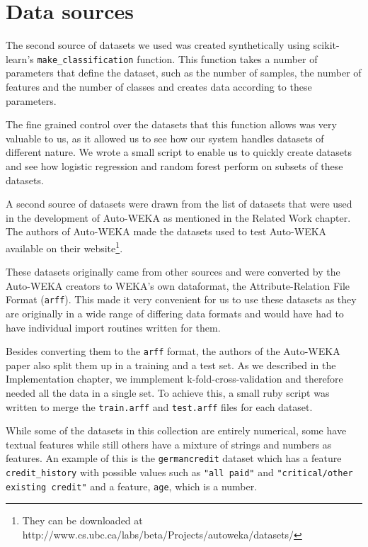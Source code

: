 \documentclass[a4paper,12pt,twoside,openright]{report}
\begin{document}



\section{Data sources}
The second source of datasets we used was created synthetically using scikit-learn's \texttt{make\_classification} function. This function takes a number of parameters that define the dataset, such as the number of samples, the number of features and the number of classes and creates data according to these parameters. 

The fine grained control over the datasets that this function allows was very valuable to us, as it allowed us to see how our system handles datasets of different nature. We wrote a small script to enable us to quickly create datasets and see how logistic regression and random forest perform on subsets of these datasets.

A second source of datasets were drawn from the list of datasets that were used in the development of Auto-WEKA as mentioned in the Related Work chapter. The authors of Auto-WEKA made the datasets used to test Auto-WEKA available on their website\footnote{They can be downloaded at http://www.cs.ubc.ca/labs/beta/Projects/autoweka/datasets/}.

These datasets originally came from other sources \cite{Lichman:2013, Larochelle:2007:EED:1273496.1273556, Krizhevsky09learningmultiple} and were converted by the Auto-WEKA creators to WEKA's own dataformat, the Attribute-Relation File Format (\texttt{arff}). This made it very convenient for us to use these datasets as they are originally in a wide range of differing data formats and would have had to have individual import routines written for them. 

Besides converting them to the \texttt{arff} format, the authors of the Auto-WEKA paper also split them up in a training and a test set. As we described in the Implementation chapter, we immplement k-fold-cross-validation and therefore needed all the data in a single set. To achieve this, a small ruby script was written to merge the \texttt{train.arff} and \texttt{test.arff} files for each dataset.


While some of the datasets in this collection are entirely numerical, some have textual features while still others have a mixture of strings and numbers as features. An example of this is the \texttt{germancredit} dataset which has a feature \texttt{credit\_history} with possible values such as \texttt{"all paid"} and \texttt{"critical/other existing credit"} and a feature,  \texttt{age}, which is a number.
\end{document}
